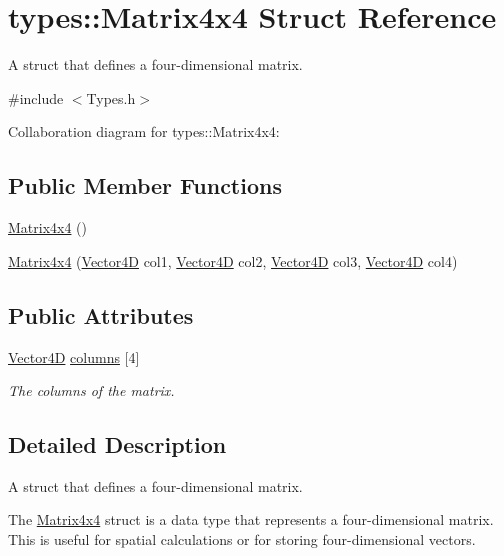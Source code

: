\hypertarget{structtypes_1_1_matrix4x4}{}\section{types\+:\+:Matrix4x4 Struct Reference}
\label{structtypes_1_1_matrix4x4}


A struct that defines a four-\/dimensional matrix.  




{\ttfamily \#include $<$Types.\+h$>$}



Collaboration diagram for types\+:\+:Matrix4x4\+:
\subsection*{Public Member Functions}
\begin{DoxyCompactItemize}
\item 
\hyperlink{structtypes_1_1_matrix4x4_a991b7593e377c5d0597e9d873b606dbb}{Matrix4x4} ()
\item 
\hyperlink{structtypes_1_1_matrix4x4_a07ad558be63e1252b5603e19d329113e}{Matrix4x4} (\hyperlink{structtypes_1_1_vector4_d}{Vector4\+D} col1, \hyperlink{structtypes_1_1_vector4_d}{Vector4\+D} col2, \hyperlink{structtypes_1_1_vector4_d}{Vector4\+D} col3, \hyperlink{structtypes_1_1_vector4_d}{Vector4\+D} col4)
\end{DoxyCompactItemize}
\subsection*{Public Attributes}
\begin{DoxyCompactItemize}
\item 
\hyperlink{structtypes_1_1_vector4_d}{Vector4\+D} \hyperlink{structtypes_1_1_matrix4x4_a71eff2a403350446b93f8f11dda7b73e}{columns} \mbox{[}4\mbox{]}
\begin{DoxyCompactList}\small\item\em The columns of the matrix. \end{DoxyCompactList}\end{DoxyCompactItemize}


\subsection{Detailed Description}
A struct that defines a four-\/dimensional matrix. 

The \hyperlink{structtypes_1_1_matrix4x4}{Matrix4x4} struct is a data type that represents a four-\/dimensional matrix. This is useful for spatial calculations or for storing four-\/dimensional vectors.

